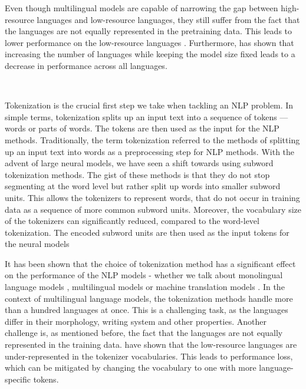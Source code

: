 Even though multilingual models are capable of narrowing the gap between high-resource languages and low-resource languages, they still suffer from the fact that the languages are not equally represented in the pretraining data. This leads to lower performance on the low-resource languages \cite{conneau_unsupervised_2020}. Furthermore, \citet{conneau_unsupervised_2020} has shown that increasing the number of languages while keeping the model size fixed leads to a decrease in performance across all languages. \cite{conneau_unsupervised_2020}

~

Tokenization is the crucial first step we take when tackling an NLP problem. In simple terms, tokenization splits up an input text into a sequence of tokens --- words or parts of words. The tokens are then used as the input for the NLP methods. Traditionally, the term tokenization referred to the methods of splitting up an input text into words as a preprocessing step for NLP methods. With the advent of large neural models, we have seen a shift towards using subword tokenization methods. The gist of these methods is that they do not stop segmenting at the word level but rather split up words into smaller subword units. This allows the tokenizers to represent words, that do not occur in training data as a sequence of more common subword units. Moreover, the vocabulary size of the tokenizers can significantly reduced, compared to the word-level tokenization. The encoded subword units are then used as the input tokens for the neural models


It has been shown that the choice of tokenization method has a significant effect on the performance of the NLP models - whether we talk about monolingual language models \cite{bostrom_byte_2020}, multilingual models \cite{rust_how_2021} or machine translation models \cite{kudo_sentencepiece_2018,gowda_finding_2020}. In the context of multilingual language models, the tokenization methods handle more than a hundred languages at once. This is a challenging task, as the languages differ in their morphology, writing system and other properties. Another challenge is, as mentioned before, the fact that the languages are not equally represented in the training data. \citet{rust_how_2021} have shown that the low-resource languages are under-represented in the tokenizer vocabularies. This leads to performance loss, which can be mitigated by changing the vocabulary to one with more language-specific tokens. \cite{rust_how_2021}

